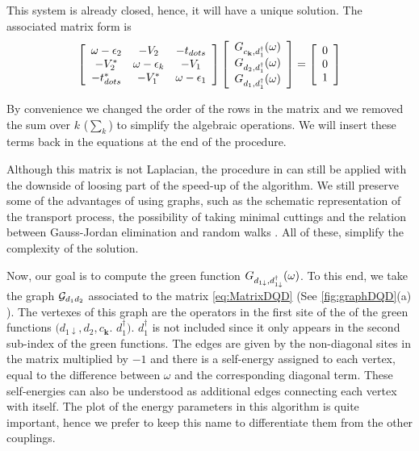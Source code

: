  \noindent This system is already closed, hence, it will have a unique solution. The associated matrix form is  \begin{equation}
% 
% 
\left[\begin{array}{ccc}
\omega-\epsilon_{2} & -V_{2} & -t_{dots}\\
-V_{2}^{*} & \omega-\epsilon_{k} & -V_{1}\\
-t_{dots}^{*} & -V_{1}^{*} & \omega-\epsilon_{1}
\end{array}\right]\left[\begin{array}{c}
\Green{c_{\mathbf{k}},d_{1}^{\dagger}}\\
\Green{d_2,d_{1}^{\dagger}}\\
\Green{d_{1},d_{1}^{\dagger}}
\end{array}\right]=\left[\begin{array}{c}
0\\
0\\
1
\end{array}\right]
\label{eq:MatrixDQD}
 \end{equation}
 
\noindent By convenience we changed the order of the rows in the matrix and we removed the sum over $k$ ($\sum_k$) to simplify the algebraic operations. We will insert these terms back in the equations at the end of the procedure.

Although this matrix is not Laplacian, the procedure in \cite{spielman10}  can still be applied with the downside of loosing part of the  speed-up of the algorithm. We still preserve  some of the advantages of using graphs, such as the schematic representation of the transport process,  the possibility of taking minimal cuttings and the relation between Gauss-Jordan elimination and random walks \cite{spielman10}  . All of these, simplify the complexity of the solution. 
 
Now, our goal is to compute the green function  $G_{d_{1\downarrow},d_{1\downarrow}^{\dagger}}(\omega)$.  To this end, we take the graph $\mathcal{G}_{d_1d_2}$ associated to the matrix  \eqref{eq:MatrixDQD} (See \ref{fig:graphDQD}(a) ).  The vertexes of this graph are the operators in the first site of the of the green functions  $(d_{1\downarrow},d_{2},c_{\boldsymbol{k}}$. $d_1^\dagger)$. $d^\dagger_1$ is not included since it only appears in the second sub-index of the green functions. The edges are given by the non-diagonal sites in the matrix  multiplied by $-1$ and there is a self-energy assigned to each vertex, equal to the difference between $\omega$  and the corresponding diagonal term. These self-energies can also be understood as additional edges connecting each vertex with itself. The plot of the energy parameters in this algorithm is quite important, hence we prefer to keep this name to differentiate them from the other couplings.  

